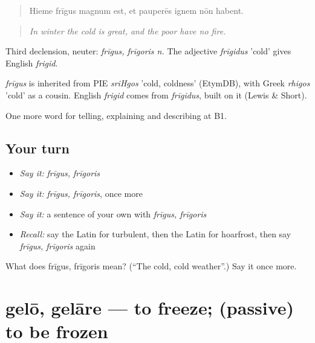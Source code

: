 \begin{quote}
Hieme frīgus magnum est, et pauperēs ignem nōn habent.
\end{quote}

\begin{quote}
\emph{In winter the cold is great, and the poor have no fire.}
\end{quote}

Third declension, neuter: \emph{frīgus, frīgoris n.} The adjective \emph{frīgidus} 'cold' gives English \emph{frigid}.

\begin{cousinweb}
\emph{frīgus} is inherited from PIE \emph{sriHgos} 'cold, coldness' (EtymDB), with Greek \emph{rhigos} 'cold' as a cousin. English \emph{frigid} comes from \emph{frīgidus}, built on it (Lewis \& Short).
\end{cousinweb}

\begin{grammarlens}[title={What you've built}]
One more word for telling, explaining and describing at B1.
\end{grammarlens}

\subsection*{Your turn}
\begin{itemize}
\raggedright
  \item \emph{Say it:} \emph{frīgus, frīgoris}
  \item \emph{Say it:} \emph{frīgus, frīgoris}, once more
  \item \emph{Say it:} a sentence of your own with \emph{frīgus, frīgoris}
  \item \emph{Recall:} say the Latin for turbulent, then the Latin for hoarfrost, then say \emph{frīgus, frīgoris} again
\end{itemize}

\begin{tcolorbox}[breakable,colback=teal!4,colframe=teal!35!black,title={Before you move on}]
What does frīgus, frīgoris mean? (\textquotedblleft{}The cold, cold weather\textquotedblright{}.) Say it once more.
\end{tcolorbox}
\section[gelō, gelāre]{gelō, gelāre — to freeze; (passive) to be frozen}

\label{lesson:LA-C486-gelo}



